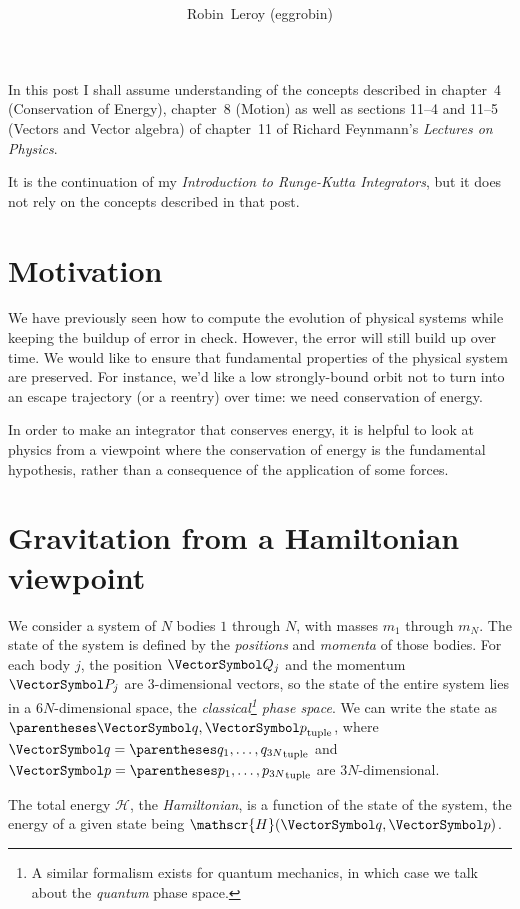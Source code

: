 \documentclass[10pt, a4paper, twoside]{basestyle}
\title{%
\textdisplay{%
A Short Introduction Hamiltonian Mechanics}%
}
\author{Robin~Leroy (eggrobin)}
\begin{document}
\maketitle
In this post I shall assume understanding of the concepts described in
chapter~4 (Conservation of Energy), chapter~8 (Motion) as well as sections
11--4 and 11--5 (Vectors and Vector algebra) of chapter~11 of Richard
Feynmann's \emph{Lectures on Physics}.

It is the continuation of my \emph{Introduction to Runge-Kutta Integrators},
but it does not rely on the concepts described in that post.

\section{Motivation}
We have previously seen how to compute the evolution of physical systems while
keeping the buildup of error in check. However, the error will still build up
over time. We would like to ensure that fundamental properties of the physical
system are preserved. For instance, we'd like a low strongly-bound orbit not to
turn into an escape trajectory (or a reentry) over time: we need conservation
of energy.

In order to make an integrator that conserves energy, it is helpful to look at
physics from a viewpoint where the conservation of energy is the fundamental
hypothesis, rather than a consequence of the application of some forces.

\newcommand{\Hamiltonian}{\mathscr{H}}
\section{Gravitation from a Hamiltonian viewpoint}
We consider a system of $N$ bodies $1$ through $N$, with masses $m_1$ through
$m_N$. The state of the system is defined by the \emph{positions} and
\emph{momenta} of those bodies. For each body $j$, the position $\vQ_j$ and the
momentum $\vP_j$ are 3-dimensional vectors, so the state of the entire system
lies in a $6N$-dimensional space, the \emph{classical\footnote{A similar
formalism exists for quantum mechanics, in which case we talk about the
\emph{quantum} phase space.} phase space}.
We can write the state as $\tuple{\vq, \vp}$, where $\vq = \tuple{q_1, \dotsc,
q_{3N}}$ and $\vp =  \tuple{p_1, \dotsc, p_{3N}}$ are $3N$-dimensional.

The total energy $\Hamiltonian$, the \emph{Hamiltonian}, is a function
of the state of the system, the energy of a given state being $\Hamiltonian(\vq,
\vp)$.
\end{document}
